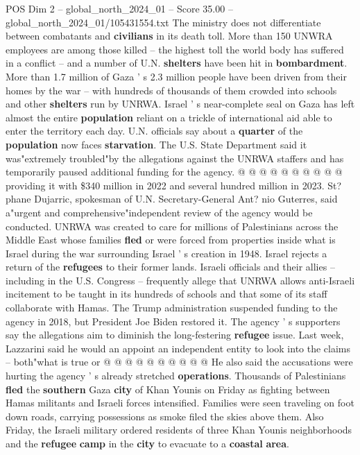 \begin{textsample}{POS Dim 2 – global\_north\_2024\_01 – Score 35.00 – global\_north\_2024\_01/105431554.txt}
The ministry does not differentiate between combatants and \textbf{civilians} in its death toll.
More than 150 UNWRA employees are among those killed -- the highest toll the world body has suffered in a conflict -- and a number of U.N. \textbf{shelters} have been hit in \textbf{bombardment}.
More than 1.7 million of Gaza ' s 2.3 million people have been driven from their homes by the war -- with hundreds of thousands of them crowded into schools and other \textbf{shelters} run by UNRWA.
Israel ' s near-complete seal on Gaza has left almost the entire \textbf{population} reliant on a trickle of international aid able to enter the territory each day.
U.N. officials say about a \textbf{quarter} of the \textbf{population} now faces \textbf{starvation}.
The U.S.
State Department said it was"extremely troubled"by the allegations against the UNRWA staffers and has temporarily paused additional funding for the agency. @ @ @ @ @ @ @ @ @ @ providing it with \$340 million in 2022 and several hundred million in 2023.
St? phane Dujarric, spokesman of U.N.
Secretary-General Ant? nio Guterres, said a"urgent and comprehensive"independent review of the agency would be conducted.
UNRWA was created to care for millions of Palestinians across the Middle East whose families \textbf{fled} or were forced from properties inside what is Israel during the war surrounding Israel ' s creation in 1948.
Israel rejects a return of the \textbf{refugees} to their former lands.
Israeli officials and their allies -- including in the U.S.
Congress -- frequently allege that UNRWA allows anti-Israeli incitement to be taught in its hundreds of schools and that some of its staff collaborate with Hamas.
The Trump administration suspended funding to the agency in 2018, but President Joe Biden restored it.
The agency ' s supporters say the allegations aim to diminish the long-festering \textbf{refugee} issue.
Last week, Lazzarini said he would an appoint an independent entity to look into the claims -- both"what is true or @ @ @ @ @ @ @ @ @ @ He also said the accusations were hurting the agency ' s already stretched \textbf{operations}.
Thousands of Palestinians \textbf{fled} the \textbf{southern} Gaza \textbf{city} of Khan Younis on Friday as fighting between Hamas militants and Israeli forces intensified.
Families were seen traveling on foot down roads, carrying possessions as smoke filed the skies above them.
Also Friday, the Israeli military ordered residents of three Khan Younis neighborhoods and the \textbf{refugee} \textbf{camp} in the \textbf{city} to evacuate to a \textbf{coastal} \textbf{area}.

\end{textsample}
